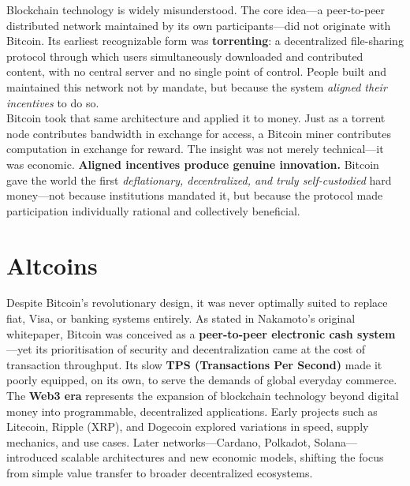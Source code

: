 \documentclass[12pt, a4paper, oneside]{report}
\theoremstyle{definition}
\begin{document}
Blockchain technology is widely misunderstood. The core idea—a peer-to-peer 
distributed network maintained by its own participants—did not originate with Bitcoin. 
Its earliest recognizable form was \textbf{torrenting}: a decentralized file-sharing 
protocol through which users simultaneously downloaded and contributed content, with 
no central server and no single point of control. People built and maintained this 
network not by mandate, but because the system \emph{aligned their incentives} to 
do so.\\[0.4cm]

Bitcoin took that same architecture and applied it to money. Just as a torrent node 
contributes bandwidth in exchange for access, a Bitcoin miner contributes computation 
in exchange for reward. The insight was not merely technical—it was economic. 
\textbf{Aligned incentives produce genuine innovation.} Bitcoin gave the world the 
first \emph{deflationary, decentralized, and truly self-custodied} hard money—not 
because institutions mandated it, but because the protocol made participation 
individually rational and collectively beneficial.





\section{Altcoins}
\label{chap:Altcoins}

Despite Bitcoin's revolutionary design, it was never optimally suited to replace 
fiat, Visa, or banking systems entirely. As stated in Nakamoto's original whitepaper, 
Bitcoin was conceived as a \textbf{peer-to-peer electronic cash system}—yet its 
prioritisation of security and decentralization came at the cost of transaction 
throughput. Its slow \textbf{TPS (Transactions Per Second)} made it poorly equipped, 
on its own, to serve the demands of global everyday commerce.\\[0.4cm]

The \textbf{Web3 era} represents the expansion of blockchain technology beyond digital 
money into programmable, decentralized applications. Early projects such as Litecoin, 
Ripple (XRP), and Dogecoin explored variations in speed, supply mechanics, and use 
cases. Later networks—Cardano, Polkadot, Solana—introduced scalable architectures 
and new economic models, shifting the focus from simple value transfer to broader 
decentralized ecosystems.\\[0.4cm]
\end{document}

